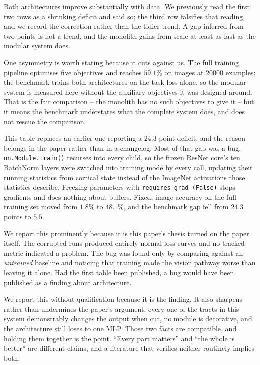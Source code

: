 \documentclass[conference]{IEEEtran}
\begin{document}
Both architectures improve substantially with data. We previously read the
first two rows as a shrinking deficit and said so; the third row falsifies
that reading, and we record the correction rather than the tidier trend. A
gap inferred from two points is not a trend, and the monolith gains from
scale at least as fast as the modular system does.

One asymmetry is worth stating because it cuts against us. The full training
pipeline optimises five objectives and reaches $59.1\%$ on images at 20000
examples; the benchmark trains both architectures on the task loss alone, so
the modular system is measured here without the auxiliary objectives it was
designed around. That is the fair comparison -- the monolith has no such
objectives to give it -- but it means the benchmark understates what the
complete system does, and does not rescue the comparison.

This table replaces an earlier one reporting a $24.3$-point deficit, and the
reason belongs in the paper rather than in a changelog. Most of that gap was a
bug. \texttt{nn.Module.train()} recurses into every child, so the frozen
ResNet core's ten BatchNorm layers were switched into training mode by every
call, updating their running statistics from cortical state instead of the
ImageNet activations those statistics describe. Freezing parameters with
\texttt{requires\_grad\_(False)} stops gradients and does nothing about
buffers. Fixed, image accuracy on the full training set moved from $1.8\%$ to
$48.1\%$, and the benchmark gap fell from $24.3$ points to $5.5$.

We report this prominently because it is this paper's thesis turned on the
paper itself. The corrupted runs produced entirely normal loss curves and no
tracked metric indicated a problem. The bug was found only by comparing against
an \emph{untrained} baseline and noticing that training made the vision
pathway worse than leaving it alone. Had the first table been published, a bug
would have been published as a finding about architecture.

We report this without qualification because it is the finding. It also sharpens
rather than undermines the paper's argument: every one of the
\ArchitectureTracts{} tracts in this system demonstrably changes the output when
cut, no module is decorative, and the architecture still loses to one MLP. Those
two facts are compatible, and holding them together is the point. ``Every part
matters'' and ``the whole is better'' are different claims, and a literature
that verifies neither routinely implies both.
\end{document}
